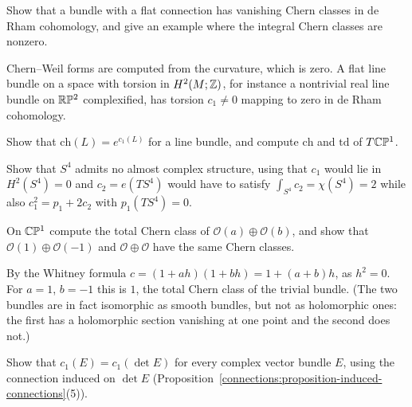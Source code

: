 \begin{exercise}\label{characteristic-classes:exercise-flat-bundle-classes}
Show that a bundle with a flat connection has vanishing Chern classes in de Rham cohomology, and give an example where the integral Chern classes are nonzero.
\end{exercise}

\begin{solution}
Chern--Weil forms are computed from the curvature, which is zero. A flat line bundle on a space with torsion in $H^2(M; \mathbb{Z})$, for instance a nontrivial real line bundle on $\mathbb{R}\mathbb{P}^2$ complexified, has
torsion $c_1 \neq 0$ mapping to zero in de Rham cohomology.
\end{solution}

\begin{exercise}\label{characteristic-classes:exercise-chern-character-line}
Show that $\mathrm{ch}(L) = e^{c_1(L)}$ for a line bundle, and compute $\mathrm{ch}$ and $\mathrm{td}$ of $T\mathbb{C}\mathbb{P}^1$.
\end{exercise}

\begin{exercise}\label{characteristic-classes:exercise-no-almost-complex}
Show that $S^4$ admits no almost complex structure, using that $c_1$ would lie in $H^2(S^4) = 0$ and $c_2 = e(TS^4)$ would have to satisfy $\int_{S^4}c_2 = \chi(S^4) = 2$ while also
$c_1^2 = p_1 + 2c_2$ with $p_1(TS^4) = 0$.
\end{exercise}

\begin{exercise}\label{characteristic-classes:exercise-chern-sum-cp1}
On $\mathbb{C}\mathbb{P}^1$ compute the total Chern class of $\mathcal{O}(a) \oplus \mathcal{O}(b)$, and show that $\mathcal{O}(1) \oplus \mathcal{O}(-1)$ and $\mathcal{O} \oplus \mathcal{O}$ have the same Chern classes.
\end{exercise}

\begin{solution}
By the Whitney formula $c = (1 + ah)(1 + bh) = 1 + (a + b)h$, as $h^2 = 0$. For $a = 1$, $b = -1$ this is $1$, the total Chern class of the trivial bundle. (The two bundles are in
fact isomorphic as smooth bundles, but not as holomorphic ones: the first has a holomorphic section vanishing at one point and the second does not.)
\end{solution}

\begin{exercise}\label{characteristic-classes:exercise-c1-determinant}
Show that $c_1(E) = c_1(\det E)$ for every complex vector bundle $E$, using the connection induced on $\det E$ (Proposition~\ref{connections:proposition-induced-connections}(5)).
\end{exercise}

